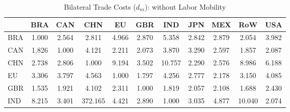 \begin{table}[htbp]
\centering
\caption{Bilateral Trade Costs ($d_{ni}$): without Labor Mobility} 
\label{tab:bilateral_costs}
\begin{tabular}{lcccccccccc}
  \hline
 & BRA & CAN & CHN & EU & GBR & IND & JPN & MEX & RoW & USA \\ 
  \hline
BRA & \textcolor[RGB]{230,148,26}{1.000} & \textcolor[RGB]{130,84,125}{2.564} & \textcolor[RGB]{99,64,156}{2.811} & \textcolor[RGB]{23,15,232}{4.966} & \textcolor[RGB]{94,61,161}{2.870} & \textcolor[RGB]{20,13,235}{5.358} & \textcolor[RGB]{97,63,158}{2.842} & \textcolor[RGB]{92,59,163}{2.879} & \textcolor[RGB]{181,117,74}{2.054} & \textcolor[RGB]{43,28,212}{3.982} \\ 
  CAN & \textcolor[RGB]{204,132,51}{1.826} & \textcolor[RGB]{230,148,26}{1.000} & \textcolor[RGB]{36,23,219}{4.121} & \textcolor[RGB]{158,102,97}{2.211} & \textcolor[RGB]{176,114,79}{2.073} & \textcolor[RGB]{46,30,209}{3.870} & \textcolor[RGB]{66,43,189}{3.290} & \textcolor[RGB]{122,79,133}{2.597} & \textcolor[RGB]{199,129,56}{1.857} & \textcolor[RGB]{168,109,87}{2.087} \\ 
  CHN & \textcolor[RGB]{117,76,138}{2.738} & \textcolor[RGB]{102,66,153}{2.806} & \textcolor[RGB]{230,148,26}{1.000} & \textcolor[RGB]{8,5,247}{9.194} & \textcolor[RGB]{56,36,199}{3.502} & \textcolor[RGB]{3,2,252}{10.757} & \textcolor[RGB]{153,99,102}{2.290} & \textcolor[RGB]{125,81,130}{2.576} & \textcolor[RGB]{10,7,245}{8.986} & \textcolor[RGB]{15,10,240}{6.188} \\ 
  EU & \textcolor[RGB]{64,41,191}{3.306} & \textcolor[RGB]{51,33,204}{3.797} & \textcolor[RGB]{28,18,227}{4.563} & \textcolor[RGB]{230,148,26}{1.000} & \textcolor[RGB]{212,137,43}{1.797} & \textcolor[RGB]{33,21,222}{4.256} & \textcolor[RGB]{112,73,143}{2.777} & \textcolor[RGB]{163,106,92}{2.178} & \textcolor[RGB]{74,48,181}{3.150} & \textcolor[RGB]{41,26,214}{4.085} \\ 
  GBR & \textcolor[RGB]{219,142,36}{1.535} & \textcolor[RGB]{194,125,61}{1.921} & \textcolor[RGB]{38,25,217}{4.102} & \textcolor[RGB]{148,96,107}{2.311} & \textcolor[RGB]{230,148,26}{1.000} & \textcolor[RGB]{209,135,46}{1.819} & \textcolor[RGB]{178,115,76}{2.057} & \textcolor[RGB]{166,107,89}{2.108} & \textcolor[RGB]{217,140,38}{1.688} & \textcolor[RGB]{135,87,120}{2.430} \\ 
  IND & \textcolor[RGB]{13,8,242}{8.215} & \textcolor[RGB]{61,40,194}{3.401} & \textcolor[RGB]{0,0,255}{372.165} & \textcolor[RGB]{31,20,224}{4.421} & \textcolor[RGB]{89,58,166}{2.890} & \textcolor[RGB]{230,148,26}{1.000} & \textcolor[RGB]{84,54,171}{3.035} & \textcolor[RGB]{25,16,230}{4.877} & \textcolor[RGB]{5,3,250}{10.040} & \textcolor[RGB]{173,112,82}{2.074} \\ 

\end{tabular}
\end{table}
